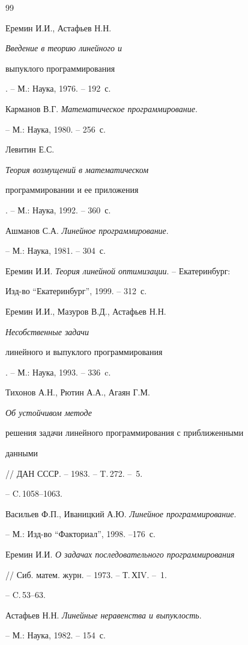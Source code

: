 \begin{thebibliography}{99}







Еремин И.И., Астафьев Н.Н. {\em Введение в теорию линейного и


выпуклого программирования}. -- М.: Наука, 1976. -- 192~с.




Карманов В.Г. {\em Математическое программирование}.


-- М.: Наука, 1980. -- 256~с.




Левитин Е.С. {\em Теория возмущений в математическом


программировании и ее приложения}. -- М.: Наука, 1992. -- 360~с.




Ашманов С.А. {\em Линейное программирование}.


-- М.: Наука, 1981. -- 304~с.




Еремин И.И. {\em Теория линейной оптимизации}. -- Екатеринбург:


Изд-во ``Екатеринбург'', 1999. -- 312~с.




Еремин И.И., Мазуров В.Д., Астафьев Н.Н. {\em Несобственные задачи


линейного и выпуклого программирования}. -- М.: Наука, 1993. -- 336~c.




Тихонов А.Н., Рютин А.А., Агаян Г.М. {\em Об устойчивом методе


решения задачи линейного программирования с приближенными


данными} // ДАН СССР. -- 1983. -- T.\,272. -- \No\,5.


-- C.\,1058--1063.




Васильев Ф.П., Иваницкий А.Ю. {\em Линейное программирование}.


-- М.: Изд-во ``Факториал'', 1998. --176~с.




Еремин И.И. {\em О задачах последовательного программирования}


// Сиб. матем. журн. -- 1973. -- Т.\,ХIV. -- \No\,1.


-- C.\,53--63.




Астафьев Н.Н. {\em Линейные неравенства и выпуклость}.


-- М.: Наука, 1982. -- 154~с.





\end{thebibliography}





